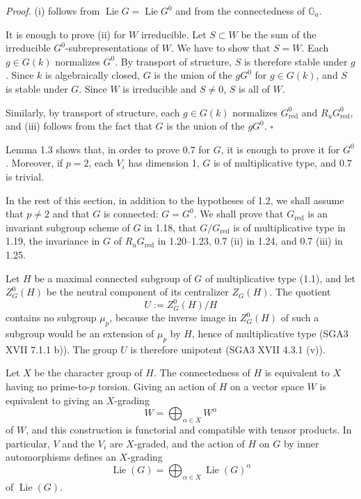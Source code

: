 \documentclass[10pt]{article}
\newcommand{\Ga}{\mathbb G_a}
\newcommand{\Lie}{\operatorname{Lie}}
\newcommand{\Ru}{R_u}
\newcommand{\red}{\mathrm{red}}
\theoremstyle{deligne}
\newenvironment{proofdel}{\textit{Proof.}}{\hfill$\square$}
\newcommand{\heading}[1]{\vspace{0.7em}\noindent{\bfseries #1}\quad}
\begin{document}
\begin{proofdel}
(i) follows from \(\Lie G=\Lie G^0\) and from the connectedness of \(\Ga\).

It is enough to prove (ii) for \(W\) irreducible. Let \(S\subset W\) be the sum of the irreducible \(G^0\)-subrepresentations of \(W\). We have to show that \(S=W\). Each \(g\in G(k)\) normalizes \(G^0\). By transport of structure, \(S\) is therefore stable under \(g\). Since \(k\) is algebraically closed, \(G\) is the union of the \(gG^0\) for \(g\in G(k)\), and \(S\) is stable under \(G\). Since \(W\) is irreducible and \(S\ne0\), \(S\) is all of \(W\).

Similarly, by transport of structure, each \(g\in G(k)\) normalizes \(G^0_{\red}\) and \(\Ru G^0_{\red}\), and (iii) follows from the fact that \(G\) is the union of the \(gG^0\).
\end{proofdel}

\heading{1.4.} Lemma 1.3 shows that, in order to prove 0.7 for \(G\), it is enough to prove it for \(G^0\). Moreover, if \(p=2\), each \(V_i\) has dimension 1, \(G\) is of multiplicative type, and 0.7 is trivial.

In the rest of this section, in addition to the hypotheses of 1.2, we shall assume that \(p\ne2\) and that \(G\) is connected: \(G=G^0\). We shall prove that \(G_{\red}\) is an invariant subgroup scheme of \(G\) in 1.18, that \(G/G_{\red}\) is of multiplicative type in 1.19, the invariance in \(G\) of \(\Ru G_{\red}\) in 1.20--1.23, 0.7 (ii) in 1.24, and 0.7 (iii) in 1.25.

\heading{1.5.} Let \(H\) be a maximal connected subgroup of \(G\) of multiplicative type (1.1), and let \(Z^0_G(H)\) be the neutral component of its centralizer \(Z_G(H)\). The quotient
\[
  U:=Z^0_G(H)/H
\]
contains no subgroup \(\mu_p\), because the inverse image in \(Z^0_G(H)\) of such a subgroup would be an extension of \(\mu_p\) by \(H\), hence of multiplicative type (SGA3 XVII 7.1.1 b)). The group \(U\) is therefore unipotent (SGA3 XVII 4.3.1 (v)).

\heading{1.6.} Let \(X\) be the character group of \(H\). The connectedness of \(H\) is equivalent to \(X\) having no prime-to-\(p\) torsion. Giving an action of \(H\) on a vector space \(W\) is equivalent to giving an \(X\)-grading
\[
  W=\bigoplus_{\alpha\in X}W^\alpha
\]
of \(W\), and this construction is functorial and compatible with tensor products. In particular, \(V\) and the \(V_i\) are \(X\)-graded, and the action of \(H\) on \(G\) by inner automorphisms defines an \(X\)-grading
\[
  \Lie(G)=\bigoplus_{\alpha\in X}\Lie(G)^\alpha
\]
of \(\Lie(G)\).
\end{document}
